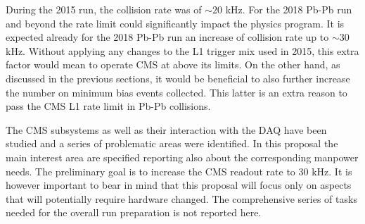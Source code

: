 During the 2015 run, the collision rate was of $\sim 20$ kHz. For the 2018 Pb-Pb run and beyond the rate limit could significantly impact the physics program. It is expected already for the 2018 Pb-Pb run an increase of collision rate up to $\sim 30$ kHz. Without applying any changes to the L1 trigger mix used in 2015, this extra factor would mean to operate CMS at above its limits. On the other hand, as discussed in the previous sections, it would be beneficial to also further increase the number on minimum bias events collected. This latter is an extra reason to pass the CMS L1 rate limit in Pb-Pb collisions. 

The CMS subsystems as well as their interaction with the DAQ have been studied and a series of problematic areas were identified. In this proposal the main interest area are specified reporting also about the corresponding manpower needs. The preliminary goal is to increase the CMS readout rate to 30 kHz. It is however important to bear in mind that this proposal will focus only on aspects that will potentially require
hardware changed. The comprehensive series of tasks needed for the overall run preparation is not reported here. 

